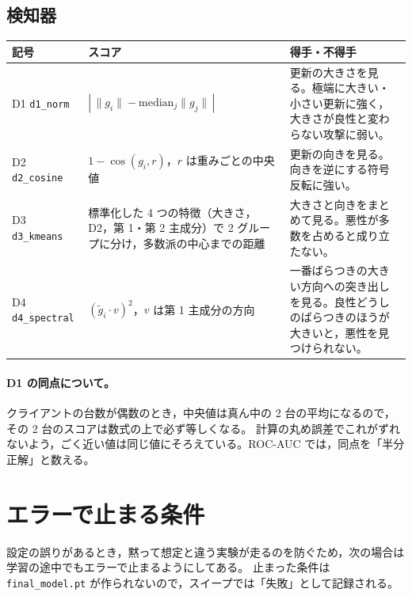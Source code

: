 \documentclass[a4j, dvipdfmx]{jsarticle}  %
\begin{document}
\subsection{検知器}

\begin{table}[H]
\centering
\begin{tabular}{@{}P{2.4cm} P{6.0cm} P{6.9cm}@{}}
\toprule
記号 & スコア & 得手・不得手 \\
\midrule
D1 \texttt{d1\_norm} & $|\,\|g_i\| - \mathrm{median}_j\|g_j\|\,|$ &
更新の大きさを見る。極端に大きい・小さい更新に強く，大きさが良性と変わらない攻撃に弱い。 \\
D2 \texttt{d2\_cosine} & $1 - \cos(g_i, r)$，$r$ は重みごとの中央値 &
更新の向きを見る。向きを逆にする符号反転に強い。 \\
D3 \texttt{d3\_kmeans} & 標準化した 4 つの特徴（大きさ，D2，第 1・第 2 主成分）で 2 グループに分け，多数派の中心までの距離 &
大きさと向きをまとめて見る。悪性が多数を占めると成り立たない。 \\
D4 \texttt{d4\_spectral} & $(\tilde{g}_i \cdot v)^2$，$v$ は第 1 主成分の方向 &
一番ばらつきの大きい方向への突き出しを見る。良性どうしのばらつきのほうが大きいと，悪性を見つけられない。 \\
\bottomrule
\end{tabular}
\end{table}

\paragraph{D1 の同点について。}
クライアントの台数が偶数のとき，中央値は真ん中の 2 台の平均になるので，その 2 台のスコアは数式の上で必ず等しくなる。
計算の丸め誤差でこれがずれないよう，ごく近い値は同じ値にそろえている。ROC-AUC では，同点を「半分正解」と数える。

\section{エラーで止まる条件}
\label{sec:guards}

設定の誤りがあるとき，黙って想定と違う実験が走るのを防ぐため，次の場合は学習の途中でもエラーで止まるようにしてある。
止まった条件は \texttt{final\_model.pt} が作られないので，スイープでは「失敗」として記録される。
\end{document}
